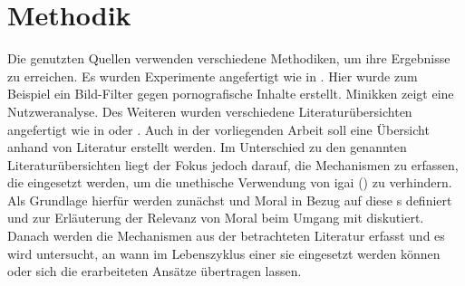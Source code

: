 \chapter{Methodik}

Die genutzten Quellen verwenden verschiedene Methodiken, um ihre Ergebnisse zu erreichen. Es wurden Experimente angefertigt wie in \cite[Blocking objectionable images]{Zheng}. Hier wurde zum Beispiel ein Bild-Filter gegen pornografische Inhalte erstellt. Minikken \cite{Minkkinen} zeigt eine Nutzweranalyse. Des Weiteren wurden verschiedene Literaturübersichten angefertigt wie in \cite[Biases in  Systems]{Srinivasan} oder \cite[The global landscape of  ethics guidelines]{Jobin}.
Auch in der vorliegenden Arbeit soll eine Übersicht anhand von Literatur erstellt werden. Im Unterschied zu den genannten Literaturübersichten liegt der Fokus jedoch darauf, die Mechanismen zu erfassen, die eingesetzt werden, um die unethische Verwendung von \Gls{igai} () zu verhindern. Als Grundlage hierfür werden zunächst  und Moral in Bezug auf diese s definiert und zur Erläuterung der
Relevanz von Moral beim Umgang mit  diskutiert. Danach werden die Mechanismen aus der betrachteten Literatur erfasst und es wird untersucht, an wann im Lebenszyklus einer  sie eingesetzt werden können oder sich die erarbeiteten Ansätze übertragen lassen.